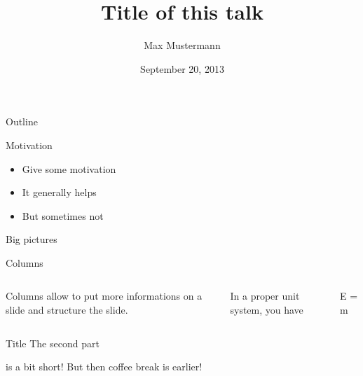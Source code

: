 \documentclass[mathserif]{beamer}
\title{Title of this talk}
\author{Max Mustermann}
\institute{University of Mustercity}
\date{September 20, 2013}
\newcommand\bad[1]{{\color{red}#1}}
\newcommand\good[1]{{\color{\sndcol}#1}}
\newcommand\sndcol{\mygreenblue}
\begin{document}
\begin{frame}
  \titlepage{}
\end{frame}


\begin{Bframe}{Outline}
  \tableofcontents
\end{Bframe}



\begin{Bframe}
  {Motivation}
  \begin{itemize}
    \item Give some motivation 
    \item It generally helps 
    \item But sometimes not
  \end{itemize}
\end{Bframe}

\begin{Bframe}
  {Big pictures}
\end{Bframe}

\begin{Bframe}
  {Columns}
  \begin{columns}
      Columns allow to put more informations on a slide and structure the slide.

      In a proper unit system, you have
      \begin{Balign}
        E = m
      \end{Balign}
  \end{columns}
\end{Bframe}


\begin{Bframe}
  [Subtitle]{Title}
  The second part
  \pause{}

  is a bit \bad{short}! But then coffee break is \good{earlier}!
\end{Bframe}
\end{document}
